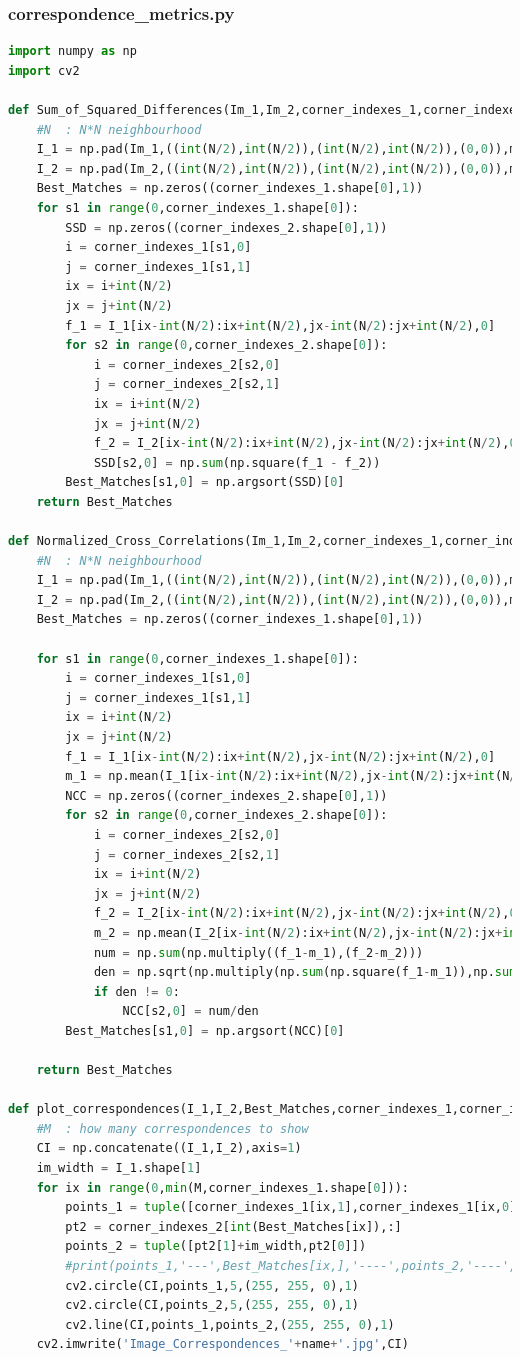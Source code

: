 \documentclass{article}
\begin{document}
\subsubsection{correspondence\_metrics.py}
\begin{lstlisting}[language=Python]
import numpy as np
import cv2

def Sum_of_Squared_Differences(Im_1,Im_2,corner_indexes_1,corner_indexes_2,N,padding_mode='constant'):
	#N	: N*N neighbourhood
	I_1 = np.pad(Im_1,((int(N/2),int(N/2)),(int(N/2),int(N/2)),(0,0)),mode=padding_mode)
	I_2 = np.pad(Im_2,((int(N/2),int(N/2)),(int(N/2),int(N/2)),(0,0)),mode=padding_mode)
	Best_Matches = np.zeros((corner_indexes_1.shape[0],1))
	for s1 in range(0,corner_indexes_1.shape[0]):
		SSD = np.zeros((corner_indexes_2.shape[0],1))
		i = corner_indexes_1[s1,0]
		j = corner_indexes_1[s1,1]
		ix = i+int(N/2)
		jx = j+int(N/2)
		f_1 = I_1[ix-int(N/2):ix+int(N/2),jx-int(N/2):jx+int(N/2),0]
		for s2 in range(0,corner_indexes_2.shape[0]):
			i = corner_indexes_2[s2,0]
			j = corner_indexes_2[s2,1]
			ix = i+int(N/2)
			jx = j+int(N/2)
			f_2 = I_2[ix-int(N/2):ix+int(N/2),jx-int(N/2):jx+int(N/2),0]
			SSD[s2,0] = np.sum(np.square(f_1 - f_2))
		Best_Matches[s1,0] = np.argsort(SSD)[0]
	return Best_Matches

def Normalized_Cross_Correlations(Im_1,Im_2,corner_indexes_1,corner_indexes_2,N,padding_mode='constant'):
	#N	: N*N neighbourhood
	I_1 = np.pad(Im_1,((int(N/2),int(N/2)),(int(N/2),int(N/2)),(0,0)),mode=padding_mode)
	I_2 = np.pad(Im_2,((int(N/2),int(N/2)),(int(N/2),int(N/2)),(0,0)),mode=padding_mode)
	Best_Matches = np.zeros((corner_indexes_1.shape[0],1))

	for s1 in range(0,corner_indexes_1.shape[0]):
		i = corner_indexes_1[s1,0]
		j = corner_indexes_1[s1,1]
		ix = i+int(N/2)
		jx = j+int(N/2)
		f_1 = I_1[ix-int(N/2):ix+int(N/2),jx-int(N/2):jx+int(N/2),0]
		m_1 = np.mean(I_1[ix-int(N/2):ix+int(N/2),jx-int(N/2):jx+int(N/2),0])
		NCC = np.zeros((corner_indexes_2.shape[0],1))
		for s2 in range(0,corner_indexes_2.shape[0]):
			i = corner_indexes_2[s2,0]
			j = corner_indexes_2[s2,1]
			ix = i+int(N/2)
			jx = j+int(N/2)
			f_2 = I_2[ix-int(N/2):ix+int(N/2),jx-int(N/2):jx+int(N/2),0]
			m_2 = np.mean(I_2[ix-int(N/2):ix+int(N/2),jx-int(N/2):jx+int(N/2),0])
			num = np.sum(np.multiply((f_1-m_1),(f_2-m_2)))
			den = np.sqrt(np.multiply(np.sum(np.square(f_1-m_1)),np.sum(np.square(f_2-m_2))))
			if den != 0:
				NCC[s2,0] = num/den
		Best_Matches[s1,0] = np.argsort(NCC)[0]

	return Best_Matches

def plot_correspondences(I_1,I_2,Best_Matches,corner_indexes_1,corner_indexes_2,M,name):
	#M	: how many correspondences to show
	CI = np.concatenate((I_1,I_2),axis=1)
	im_width = I_1.shape[1]
	for ix in range(0,min(M,corner_indexes_1.shape[0])):
		points_1 = tuple([corner_indexes_1[ix,1],corner_indexes_1[ix,0]])
		pt2 = corner_indexes_2[int(Best_Matches[ix]),:]
		points_2 = tuple([pt2[1]+im_width,pt2[0]])
		#print(points_1,'---',Best_Matches[ix,],'----',points_2,'----',im_width)
		cv2.circle(CI,points_1,5,(255, 255, 0),1)
		cv2.circle(CI,points_2,5,(255, 255, 0),1)
		cv2.line(CI,points_1,points_2,(255, 255, 0),1)
	cv2.imwrite('Image_Correspondences_'+name+'.jpg',CI)
\end{lstlisting}
\end{document}
